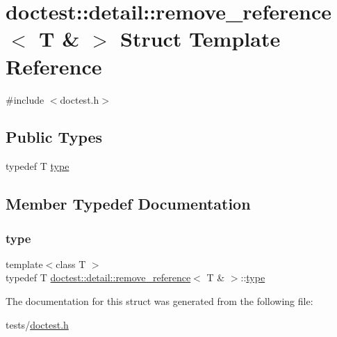 \hypertarget{structdoctest_1_1detail_1_1remove__reference_3_01T_01_6_01_4}{}\section{doctest\+:\+:detail\+:\+:remove\+\_\+reference$<$ T \& $>$ Struct Template Reference}
\label{structdoctest_1_1detail_1_1remove__reference_3_01T_01_6_01_4}


{\ttfamily \#include $<$doctest.\+h$>$}

\subsection*{Public Types}
\begin{DoxyCompactItemize}
\item 
typedef T \hyperlink{structdoctest_1_1detail_1_1remove__reference_3_01T_01_6_01_4_a37201537c0190f14f504d9f507bc042a}{type}
\end{DoxyCompactItemize}


\subsection{Member Typedef Documentation}
\mbox{\label{structdoctest_1_1detail_1_1remove__reference_3_01T_01_6_01_4_a37201537c0190f14f504d9f507bc042a}} 
\subsubsection{\texorpdfstring{type}{type}}
{\footnotesize\ttfamily template$<$class T $>$ \\
typedef T \hyperlink{structdoctest_1_1detail_1_1remove__reference}{doctest\+::detail\+::remove\+\_\+reference}$<$ T \& $>$\+::\hyperlink{structdoctest_1_1detail_1_1remove__reference_3_01T_01_6_01_4_a37201537c0190f14f504d9f507bc042a}{type}}



The documentation for this struct was generated from the following file\+:\begin{DoxyCompactItemize}
\item 
tests/\hyperlink{doctest_8h}{doctest.\+h}\end{DoxyCompactItemize}
